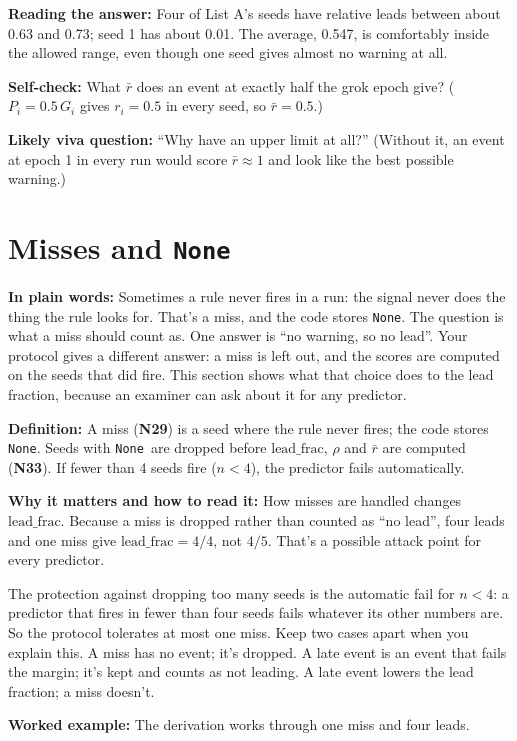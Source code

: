 \documentclass[11pt,a4paper,oneside,openany]{report}
\newcommand{\leadfrac}{\mathrm{lead\_frac}}
\newcommand{\rbar}{\bar{r}}
\newcommand{\None}{\texttt{None}}
\newcommand{\gl}[1]{\textbf{#1}}   %
\newcommand{\fplain}{\textbf{In plain words:} }
\newcommand{\fdef}{\textbf{Definition:} }
\newcommand{\fread}{\par\textbf{Why it matters and how to read it:} }
\newcommand{\fans}{\par\textbf{Reading the answer:} }
\newcommand{\fex}{\par\textbf{Worked example:} }
\newcommand{\fself}{\par\textbf{Self-check:} }
\newcommand{\fviva}{\par\textbf{Likely viva question:} }
\begin{document}
\fans Four of List A's seeds have relative leads between about 0.63 and 0.73; seed 1 has about 0.01. The average, 0.547, is comfortably inside the allowed range, even though one seed gives almost no warning at all.

\fself What $\rbar$ does an event at exactly half the grok epoch give? ($P_i = 0.5\,G_i$ gives $r_i = 0.5$ in every seed, so $\rbar = 0.5$.)
\fviva ``Why have an upper limit at all?'' (Without it, an event at epoch 1 in every run would score $\rbar \approx 1$ and look like the best possible warning.)

\section{Misses and \None}
\fplain Sometimes a rule never fires in a run: the signal never does the thing the rule looks for. That's a miss, and the code stores \None. The question is what a miss should count as. One answer is ``no warning, so no lead''. Your protocol gives a different answer: a miss is left out, and the scores are computed on the seeds that did fire. This section shows what that choice does to the lead fraction, because an examiner can ask about it for any predictor.

\fdef A miss (\gl{N29}) is a seed where the rule never fires; the code stores \None. Seeds with \None\ are dropped before $\leadfrac$, $\rho$ and $\rbar$ are computed (\gl{N33}). If fewer than 4 seeds fire ($n < 4$), the predictor fails automatically.
\fread How misses are handled changes $\leadfrac$. Because a miss is dropped rather than counted as ``no lead'', four leads and one miss give $\leadfrac = 4/4$, not $4/5$. That's a possible attack point for every predictor.

The protection against dropping too many seeds is the automatic fail for $n < 4$: a predictor that fires in fewer than four seeds fails whatever its other numbers are. So the protocol tolerates at most one miss. Keep two cases apart when you explain this. A miss has no event; it's dropped. A late event is an event that fails the margin; it's kept and counts as not leading. A late event lowers the lead fraction; a miss doesn't.

\fex The derivation works through one miss and four leads.
\end{document}
